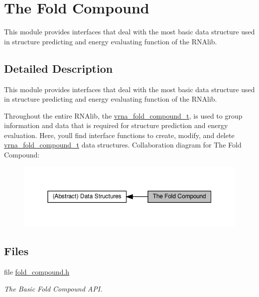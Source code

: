 \hypertarget{group__fold__compound}{}\section{The Fold Compound}
\label{group__fold__compound}


This module provides interfaces that deal with the most basic data structure used in structure predicting and energy evaluating function of the R\+N\+Alib.  




\subsection{Detailed Description}
This module provides interfaces that deal with the most basic data structure used in structure predicting and energy evaluating function of the R\+N\+Alib. 

Throughout the entire R\+N\+Alib, the \hyperlink{group__fold__compound_ga1b0cef17fd40466cef5968eaeeff6166}{vrna\+\_\+fold\+\_\+compound\+\_\+t}, is used to group information and data that is required for structure prediction and energy evaluation. Here, you\textquotesingle{}ll find interface functions to create, modify, and delete \hyperlink{group__fold__compound_ga1b0cef17fd40466cef5968eaeeff6166}{vrna\+\_\+fold\+\_\+compound\+\_\+t} data structures. Collaboration diagram for The Fold Compound\+:
\nopagebreak
\begin{figure}[H]
\begin{center}
\leavevmode
\includegraphics[width=350pt]{group__fold__compound}
\end{center}
\end{figure}
\subsection*{Files}
\begin{DoxyCompactItemize}
\item 
file \hyperlink{fold__compound_8h}{fold\+\_\+compound.\+h}
\begin{DoxyCompactList}\small\item\em The Basic Fold Compound A\+PI. \end{DoxyCompactList}\end{DoxyCompactItemize}
